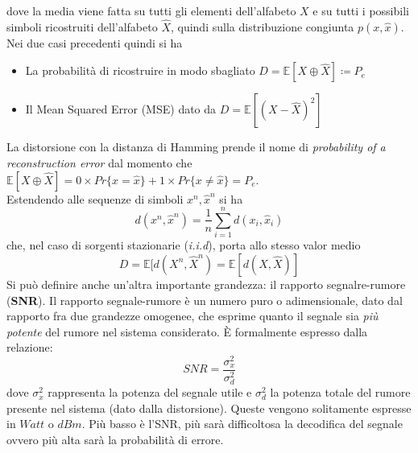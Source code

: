 dove la media viene fatta su tutti gli elementi dell'alfabeto $X$ e su tutti i possibili simboli ricostruiti dell'alfabeto $\hat{X}$, quindi sulla distribuzione congiunta $p(x, \hat{x})$.\\
Nei due casi precedenti quindi si ha
\begin{itemize}
    \item La probabilit\`a di ricostruire in modo sbagliato $D = \mathbb{E} [X \oplus \hat{X}] \coloneqq P_e$
    \item Il Mean Squared Error (MSE) dato da $D = \mathbb{E} [(X - \hat{X})^2]$
\end{itemize}
La distorsione con la distanza di Hamming prende il nome di \textit{probability of a reconstruction error} dal momento che $\mathbb{E}[X \oplus \hat{X}] = 0 \times Pr\{x=\hat{x}\} + 1 \times Pr\{x \neq \hat{x}\} = P_e$.\\
Estendendo alle sequenze di simboli $x^n, \hat{x}^n$ si ha
\begin{equation}
    d(x^n, \hat{x}^n) = \frac{1}{n} \sum_{i=1}^n d(x_i, \hat{x}_i)
\end{equation}
che, nel caso di sorgenti stazionarie (\textit{i.i.d}), porta allo stesso valor medio
\begin{equation}
    D = \mathbb{E} [d(X^n, \hat{X}^n) = \mathbb{E}[d(X, \hat{X})]
\end{equation}
Si pu\`o definire anche un'altra importante grandezza: il rapporto segnalre-rumore (\textbf{SNR}). Il rapporto segnale-rumore è un numero puro o adimensionale, dato dal rapporto fra due grandezze omogenee, che esprime quanto il segnale sia \textit{più potente} del rumore nel sistema considerato. È formalmente espresso dalla relazione: 
\begin{equation}
    SNR = \frac{\sigma_x^2}{\sigma_d^2}
\end{equation}
dove $\sigma_x^2$ rappresenta la potenza del segnale utile e $\sigma_d^2$ la potenza totale del rumore presente nel sistema (dato dalla distorsione). Queste vengono solitamente espresse in $Watt$ o $dBm$. Più basso è l'SNR, più sarà difficoltosa la decodifica del segnale ovvero più alta sarà la probabilità di errore.

